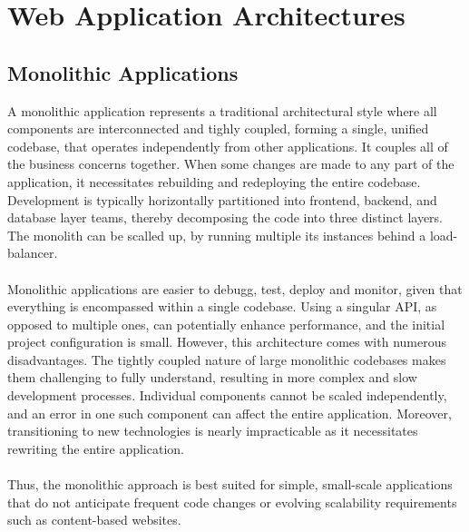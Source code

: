 \section{Web Application Architectures}
\subsection{Monolithic Applications}
A monolithic application represents a traditional architectural style where all components are interconnected and tighly coupled, forming a single, unified codebase, that operates independently from other applications. It couples all of the business concerns together. When some changes are made to any part of the application, it necessitates rebuilding and redeploying the entire codebase. Development is typically horizontally partitioned into frontend, backend, and database layer teams, thereby decomposing the code into three distinct layers.  The monolith can be scalled up, by running multiple its instances behind a load-balancer. \\\\
Monolithic applications are easier to debugg, test, deploy and monitor, given that everything is encompassed within a single codebase. Using a singular API, as opposed to multiple ones, can potentially enhance performance, and the initial project configuration is small. However, this architecture comes with numerous disadvantages. The tightly coupled nature of large monolithic codebases makes them challenging to fully understand, resulting in more complex and slow development processes. Individual components cannot be scaled independently, and an error in one such component can affect the entire application. Moreover, transitioning to new technologies is nearly impracticable as it necessitates rewriting the entire application. \\\\
Thus, the monolithic approach is best suited for simple, small-scale applications that do not anticipate frequent code changes or evolving scalability requirements such as content-based websites.

